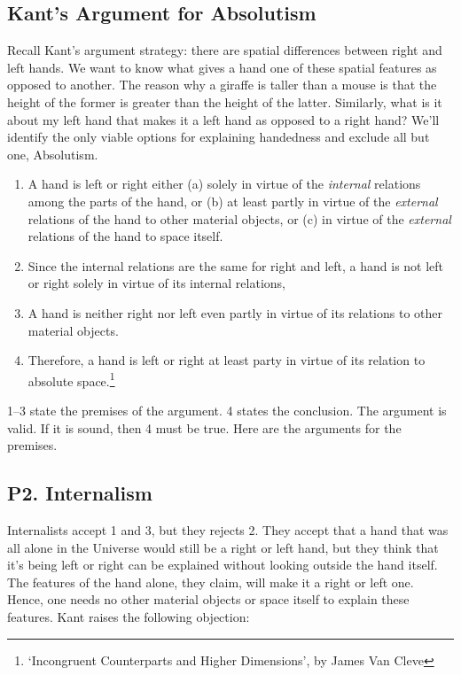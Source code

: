 \documentclass[oneside]{article}
\begin{document}
\thispagestyle{fancy}



\subsection*{Kant's Argument for Absolutism}\label{master-argument}

Recall Kant's argument strategy: there are spatial differences between right and
left hands. We want to know what gives a hand one of these spatial
features as opposed to another. The reason why a giraffe is taller than
a mouse is that the height of the former is greater than the height of
the latter. Similarly, what is it about my left hand that makes it a
left hand as opposed to a right hand? We'll identify the only viable
options for explaining handedness and exclude all but one, Absolutism.

\begin{enumerate}

\item
  A hand is left or right either (a) solely in virtue of the
  \emph{internal} relations among the parts of the hand, or (b) at least
  partly in virtue of the \emph{external} relations of the hand to other
  material objects, or (c) in virtue of the \emph{external} relations of
  the hand to space itself.
\item
  Since the internal relations are the same for right and left, a hand
  is not left or right solely in virtue of its internal relations,
\item
  A hand is neither right nor left even partly in virtue of its
  relations to other material objects.
\item
  Therefore, a hand is left or right at least party in virtue of its
  relation to absolute space.\footnote{`Incongruent Counterparts and
    Higher Dimensions', by James Van Cleve}
\end{enumerate}
1--3 state the premises of the argument. 4 states the conclusion. The
argument is valid. If it is sound, then 4 must be true. Here are the
arguments for the premises.

\subsection*{P2. Internalism}\label{p2.-internalism}

Internalists accept 1 and 3, but they rejects 2. They accept that a hand
that was all alone in the Universe would still be a right or left hand,
but they think that it's being left or right can be explained without
looking outside the hand itself. The features of the hand alone, they
claim, will make it a right or left one. Hence, one needs no other
material objects or space itself to explain these features. Kant raises the following objection:
\end{document}
